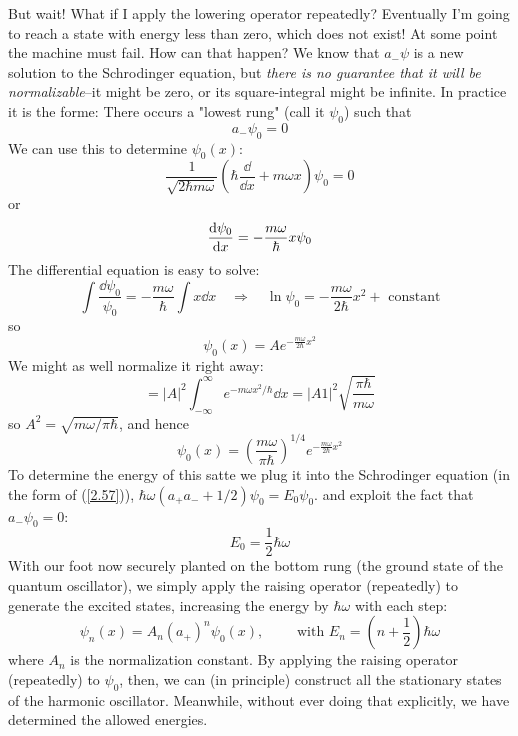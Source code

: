 But wait! What if I apply the lowering operator repeatedly? Eventually I'm going to reach a state with energy less than zero, which does not exist! At some point the machine must fail. How can that happen?  We know that $a_-\psi$ is a new solution to the Schrodinger equation, but \textit{there is no guarantee that it will be normalizable}--it might be zero, or its square-integral might be infinite. In practice it is the forme: There occurs a "lowest rung" (call it $\psi_0$) such that
\begin{equation}\label{2.58}
	a_-\psi_0=0
\end{equation}
We can use this to determine $\psi_0(x)$:
$$\frac{1}{\sqrt{2\hbar m\omega}}\left(\hbar\frac{\dd}{\dd x}+m\omega x\right)\psi_0=0$$ or $$\dv{\psi_0}{x}=-\frac{m\omega}{\hbar}x\psi_0$$
The differential equation is easy to solve:
$$\int\frac{\dd \psi_0}{\psi_0}=-\frac{m\omega}{\hbar}\int x\dd x\quad\Rightarrow\quad \ln\psi_0=-\frac{m\omega}{2\hbar}x^2+\mbox{ constant}$$ so $$\psi_0(x)=Ae^{-\frac{m\omega}{2\hbar}x^2}$$
We might as well normalize it right away: $$=|A|^2\int_{-\infty}^\infty e^{-m\omega x^2/\hbar}\dd x=|A1|^2\sqrt{\frac{\pi\hbar}{m\omega}}$$ so $A^2=\sqrt{m\omega/\pi\hbar}$, and hence
\begin{equation}\label{2.59}
	\boxed{\psi_0(x)=\left(\frac{m\omega}{\pi\hbar}\right)^{1/4}e^{-\frac{m\omega}{2\hbar}x^2}}
\end{equation}
To determine the energy of this satte we plug it into the Schrodinger equation (in the form of (\ref{2.57})), $\hbar\omega(a_+a_-+1/2)\psi_0=E_0\psi_0$. and exploit the fact that $a_-\psi_0=0$:
\begin{equation}\label{2.60}
	E_0=\frac{1}{2}\hbar\omega
\end{equation}
With our foot now securely planted on the bottom rung (the ground state of the quantum oscillator), we simply apply the raising operator (repeatedly) to generate the excited states, increasing the energy by $\hbar\omega $ with each step:
\begin{equation}\label{2.61}
	\boxed{\psi_n(x)=A_n(a_+)^n \psi_0(x),\qquad\mbox{ with  }E_n=\left(n+\frac{1}{2}\right)\hbar\omega     }
\end{equation}
where $A_n$ is the normalization constant. By applying the raising operator (repeatedly) to $\psi_0$, then, we can (in principle) construct all the stationary states of the harmonic oscillator. Meanwhile, without ever doing that explicitly, we have determined the allowed energies.

